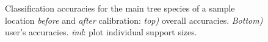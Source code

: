 \begin{figure}[H]
	\centering
	\caption{Classification accuracies for the main tree species of a sample location \textit{before} and \textit{after} calibration: \textit{top)} overall accuracies. \textit{Bottom)} user's accuracies. \textit{ind}: plot individual support sizes.}
	\label{fig:cos_oaa_ua}
\end{figure}


